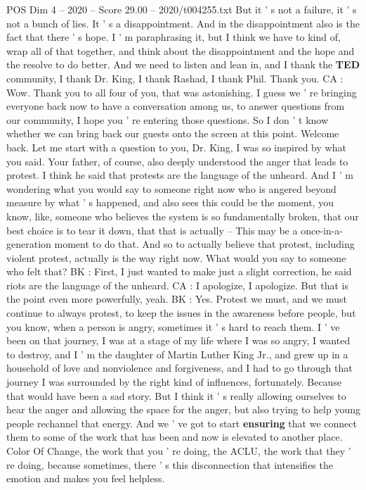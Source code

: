 \begin{textsample}{POS Dim 4 – 2020 – Score 29.00 – 2020/t004255.txt}
But it ' s not a failure, it ' s not a bunch of lies.
It ' s a disappointment.
And in the disappointment also is the fact that there ' s hope.
I ' m paraphrasing it, but I think we have to kind of, wrap all of that together, and think about the disappointment and the hope and the resolve to do better.
And we need to listen and lean in, and I thank the \textbf{TED} community, I thank Dr.
King, I thank Rashad, I thank Phil.
Thank you.
CA : Wow.
Thank you to all four of you, that was astonishing.
I guess we ' re bringing everyone back now to have a conversation among us, to answer questions from our community, I hope you ' re entering those questions.
So I don ' t know whether we can bring back our guests onto the screen at this point.
Welcome back.
Let me start with a question to you, Dr.
King, I was so inspired by what you said.
Your father, of course, also deeply understood the anger that leads to protest.
I think he said that protests are the language of the unheard.
And I ' m wondering what you would say to someone right now who is angered beyond measure by what ' s happened, and also sees this could be the moment, you know, like, someone who believes the system is so fundamentally broken, that our best choice is to tear it down, that that is actually -- This may be a once-in-a-generation moment to do that.
And so to actually believe that protest, including violent protest, actually is the way right now.
What would you say to someone who felt that?
BK : First, I just wanted to make just a slight correction, he said riots are the language of the unheard.
CA : I apologize, I apologize.
But that is the point even more powerfully, yeah.
BK : Yes.
Protest we must, and we must continue to always protest, to keep the issues in the awareness before people, but you know, when a person is angry, sometimes it ' s hard to reach them.
I ' ve been on that journey, I was at a stage of my life where I was so angry, I wanted to destroy, and I ' m the daughter of Martin Luther King Jr., and grew up in a household of love and nonviolence and forgiveness, and I had to go through that journey I was surrounded by the right kind of influences, fortunately.
Because that would have been a sad story.
But I think it ' s really allowing ourselves to hear the anger and allowing the space for the anger, but also trying to help young people rechannel that energy.
And we ' ve got to start \textbf{ensuring} that we connect them to some of the work that has been and now is elevated to another place.
Color Of Change, the work that you ' re doing, the ACLU, the work that they ' re doing, because sometimes, there ' s this disconnection that intensifies the emotion and makes you feel helpless.

\end{textsample}
